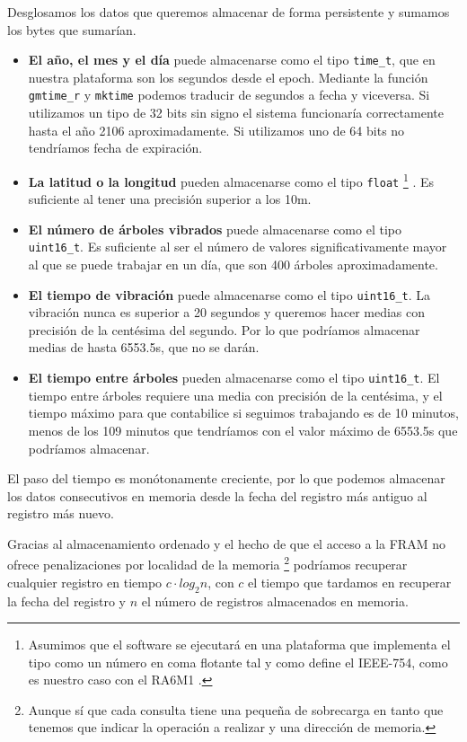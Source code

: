 Desglosamos los datos que queremos almacenar de forma persistente y sumamos los bytes que sumarían.

\begin{itemize}[noitemsep,nolistsep]
    \item \textbf{El año, el mes y el día} puede almacenarse como el tipo \texttt{time\_t}, que en nuestra
        plataforma son los segundos desde el epoch.
        Mediante la función \texttt{gmtime\_r} y \texttt{mktime} podemos traducir de
        segundos a fecha y viceversa. Si utilizamos un tipo de 32 bits sin signo el sistema funcionaría
        correctamente hasta el año 2106 aproximadamente. Si utilizamos uno de 64 bits no tendríamos fecha
        de expiración.
    \item \textbf{La latitud o la longitud} pueden almacenarse como el tipo \texttt{float}%
    \footnote{Asumimos que el software se ejecutará en una plataforma que implementa el tipo como
    un número en coma flotante tal y como define el IEEE-754, como es nuestro caso con el RA6M1 \cite{renesas:RA6M1}.}%
    . Es suficiente al tener una precisión superior a los 10m.
    \item \textbf{El número de árboles vibrados} puede almacenarse como el tipo \texttt{uint16\_t}. Es
        suficiente al ser el número de valores significativamente mayor al que se puede trabajar en un
        día, que son 400 árboles aproximadamente.
    \item \textbf{El tiempo de vibración} puede almacenarse como el tipo \texttt{uint16\_t}. La vibración nunca
        es superior a 20 segundos y queremos hacer medias con precisión de la centésima del segundo. Por lo que
        podríamos almacenar medias de hasta 6553.5s, que no se darán.
    \item \textbf{El tiempo entre árboles} pueden almacenarse como el tipo \texttt{uint16\_t}. El tiempo
        entre árboles requiere una media con precisión de la centésima, y el tiempo máximo para que contabilice
        si seguimos trabajando es de 10 minutos, menos de los 109 minutos que tendríamos con el valor máximo
        de 6553.5s que podríamos almacenar.
\end{itemize}

El paso del tiempo es monótonamente creciente, por lo que podemos almacenar los
datos consecutivos en memoria desde la fecha del registro más antiguo al registro
más nuevo.

Gracias al almacenamiento ordenado y el hecho de que el acceso a la FRAM no ofrece
penalizaciones por localidad de la memoria%
\footnote{Aunque sí que cada consulta tiene una pequeña de sobrecarga en tanto
que tenemos que indicar la operación a realizar y una dirección de memoria.}
podríamos recuperar cualquier registro en tiempo $c \cdot log_{2} n$, con $c$
el tiempo que tardamos en recuperar la fecha del registro y $n$ el número de
registros almacenados en memoria.

